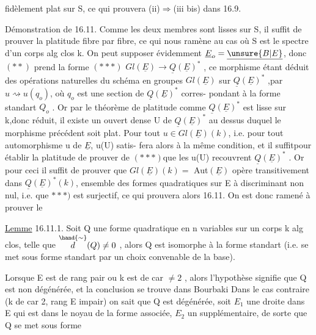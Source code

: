 
fidèlement plat sur S, ce qui prouvera  (ii)$\Longrightarrow$(iii bis) dans  16.9.

Démonstration de 16.11.  Comme les deux membres sont lisses sur S,
il suffit de prouver la platitude fibre par fibre, ce qui nous ramène au
cas où S est le spectre d'un corps alg clos k.  On peut  supposer
évidemment $\underline{E}_o=\underline{\unsure{B|E}}$, donc $(**)$ prend la forme
$(***)$   $Gl(\underline{E})\longrightarrow\underline{Q}(\underline{E})^*$ ,
ce morphisme étant déduit des opérations naturelles du schéma en groupes
$Gl(\underline{E})$ sur $\underline{Q}(\underline{E})^*$ ,par $u\rightsquigarrow u(q_o)$, où $q_o$ est une section de $\underline{Q}(\underline{E})^*$ corres-%
pondant à la forme standart $Q_o$ . Or par le théorème de platitude \hand{,}
comme $\underline{Q}(\underline{E})^*$ est lisse sur k,donc réduit, il existe un ouvert dense U de
$\underline{Q}(\underline{E})^*$ au dessus duquel le morphisme précédent soit plat.  Pour tout 
$u\in Gl(\underline{E})(k)$, i.e. pour tout automorphisme u de $\underline{E}$, u(U) satis-%
fera alors à la même condition, et il suffit\hand{,}pour établir la platitude de prouver\hand{),} 
de $(***)$\hand{,}que les u(U) recouvrent $\underline{Q}(\underline{E})^*$ . Or pour ceci il suffit de prouver
que $Gl(\underline{E})(k)=$ Aut$(\underline{E})$ opère transitivement dans $\underline{Q}(\underline{E})^*(k)$, ensemble des
formes quadratiques  sur \hand{$\checkmark$}E à discriminant non nul,  i.e. que
$***)$ est surjectif, ce \hand{\unsure{|}}qui prouvera alors 16.11.  On est donc ramené à
prouver le

\uline{Lemme} 16.11.1.  Soit Q une forme quadratique en n variables sur un corps k
alg clos, telle que $\overset{\hand{\sim}}{d}(Q)\neq 0$ , alors Q est isomorphe à la forme standart
(i.e. se met sous forme standart par un choix convenable de la base).

Lorsque E est de rang pair ou k est de car $\neq 2$ , alors l'hypothèse
signifie que Q est non dégénérée, et la conclusion se trouve dans Bourbaki
Dans le cas contraire (k de car 2,  rang E impair)  on sait que Q est
dégénérée,  soit $E_1$ une droite dans E qui est dans le noyau de la
forme associée, $E_2$ un supplémentaire, de sorte que Q se met sous forme


